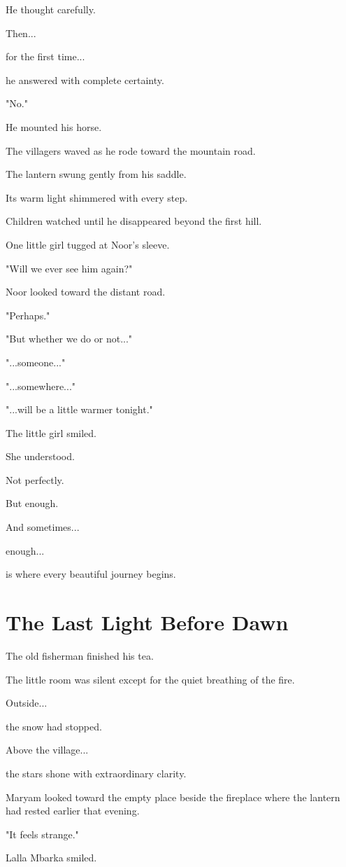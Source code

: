 \documentclass[12pt,openany]{book}
\begin{document}
He thought carefully.

Then...

for the first time...

he answered with complete certainty.

"No."

He mounted his horse.

The villagers waved as he rode toward the mountain road.

The lantern swung gently from his saddle.

Its warm light shimmered with every step.

Children watched until he disappeared beyond the first hill.

One little girl tugged at Noor's sleeve.

"Will we ever see him again?"

Noor looked toward the distant road.

"Perhaps."

"But whether we do or not..."

"...someone..."

"...somewhere..."

"...will be a little warmer tonight."

The little girl smiled.

She understood.

Not perfectly.

But enough.

And sometimes...

enough...

is where every beautiful journey begins.
\section*{The Last Light Before Dawn}

The old fisherman finished his tea.

The little room was silent except for the quiet breathing of the fire.

Outside...

the snow had stopped.

Above the village...

the stars shone with extraordinary clarity.

Maryam looked toward the empty place beside the fireplace where the lantern had rested earlier that evening.

"It feels strange."

Lalla Mbarka smiled.
\end{document}
